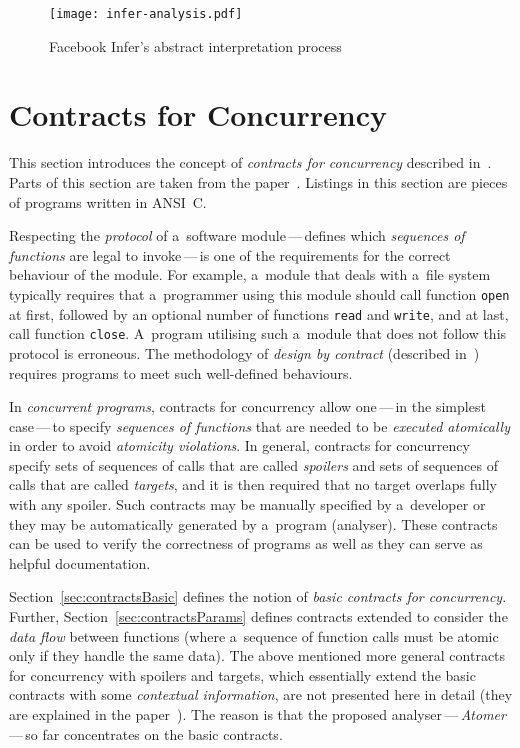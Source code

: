 \begin{figure}[hbt]
    \centering
    \texttt{[image: infer-analysis.pdf]}
    \caption{%
        Facebook Infer's abstract interpretation
        process~\cite{inferAISpeech, ppMarcin2018}
    }
    \label{fig:inferAnalysis}
\end{figure}


\section{Contracts for Concurrency}
\label{sec:contracts}


This section introduces the concept of \emph{contracts for concurrency}
described in~\cite{contracts2015, contracts2017}. Parts of this section are
taken from the paper~\cite{excel2019FBInfer}. Listings in this section are
pieces of programs written in ANSI~C.

Respecting the \emph{protocol} of a~software module\,---\,defines
which \emph{sequences of functions} are legal to invoke\,---\,is one of the
requirements for the correct behaviour of the module. For example, a~module
that deals with a~file system typically requires that a~programmer using
this module should call function \texttt{open} at first, followed by an
optional number of functions \texttt{read} and \texttt{write}, and at last,
call function \texttt{close}. A~program utilising such a~module that does
not follow this protocol is erroneous. The methodology of \emph{design by
contract} (described in~\cite{contract}) requires programs to meet
such well-defined behaviours.~\cite{contracts2015}

In \emph{concurrent programs}, contracts for concurrency allow
one\,---\,in the simplest case\,---\,to specify \emph{sequences of
functions} that are needed to be \emph{executed atomically} in order to
avoid \emph{atomicity violations}. In general, contracts for concurrency
specify sets of sequences of calls that are called \emph{spoilers} and sets
of sequences of calls that are called \emph{targets}, and it is then
required that no target overlaps fully with any spoiler. Such contracts may
be manually specified by a~developer or they may be automatically generated
by a~program (analyser). These contracts can be used to verify the
correctness of programs as well as they can serve as helpful documentation.

Section~\ref{sec:contractsBasic} defines the notion of \emph{basic contracts
for concurrency}. Further, Section~\ref{sec:contractsParams} defines
contracts extended to consider the \emph{data flow} between functions
(where a~sequence of function calls must be atomic only if they handle the
same data). The above mentioned more general contracts for concurrency with
spoilers and targets, which essentially extend the basic contracts with
some \emph{contextual information}, are not presented here in detail
(they are explained in the paper~\cite{contracts2017}). The reason is that
the proposed analyser\,---\,\emph{Atomer}\,---\,so far concentrates on the
basic contracts.

